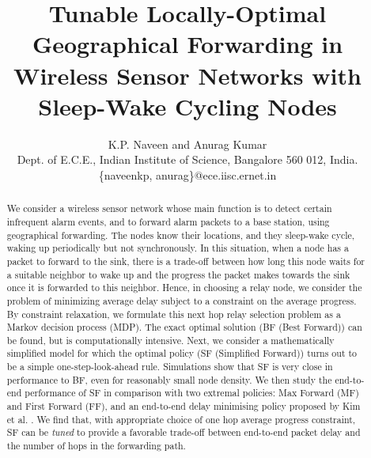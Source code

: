 \documentclass[onecolumn]{IEEEtran}
\begin{document}
\title{Tunable Locally-Optimal Geographical Forwarding in Wireless
  Sensor Networks with\\ Sleep-Wake Cycling Nodes}
\author{K.P. Naveen and Anurag Kumar\\
  {Dept. of E.C.E.,}
  {Indian Institute of Science, Bangalore 560 012, India.}\\
  {\{naveenkp, anurag\}@ece.iisc.ernet.in}}
\maketitle
\begin{abstract}
  We consider a wireless sensor network whose main function is to
  detect certain infrequent alarm events, and to forward alarm packets
  to a base station, using geographical forwarding. The nodes know
  their locations, and they sleep-wake cycle, waking up periodically
  but not synchronously. In this situation, when a node has a packet
  to forward to the sink, there is a trade-off between how long this
  node waits for a suitable neighbor to wake up and the progress the
  packet makes towards the sink once it is forwarded to this
  neighbor.  Hence, in choosing a relay node, we consider the problem
  of minimizing average delay subject to a constraint on the average progress. By
  constraint relaxation, we formulate
  this next hop relay selection problem as a Markov decision process
  (MDP). The exact optimal solution (BF (Best Forward)) can be found,
  but is computationally intensive.  Next, we consider a
  mathematically simplified model for which the optimal policy (SF (Simplified Forward)) turns out to
  be a simple one-step-look-ahead rule.  Simulations show that SF is
  very close in performance to BF, even for reasonably small node
  density.  We then study the end-to-end performance  of
  SF in comparison with two extremal policies: Max Forward (MF) and First Forward (FF), and an end-to-end
  delay minimising policy proposed by Kim et al. \cite{kim-etal09optimal-anycast}. We find that, with appropriate
  choice of one hop average progress constraint, SF can be \emph{tuned} to provide a favorable trade-off
  between end-to-end packet delay and the number of hops in the
  forwarding path.
\end{abstract}
\end{document}
